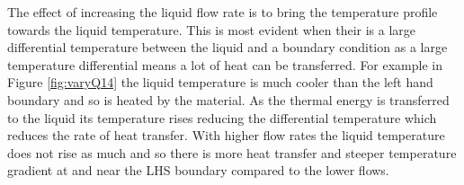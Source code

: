 \documentclass[11pt]{article}
\begin{document}
The effect of increasing the liquid flow rate is to bring the temperature profile towards the liquid temperature. This is most evident when their is a large differential temperature between the liquid and a boundary condition as a large temperature differential means a lot of heat can be transferred. For example in Figure \ref{fig:varyQ14} the liquid temperature is much cooler than the left hand boundary and so is heated by the material. As the thermal energy is transferred to the liquid its temperature rises reducing the differential temperature which reduces the rate of heat transfer. With higher flow rates the liquid temperature does not rise as much and so there is more heat transfer and steeper temperature gradient at and near the LHS boundary compared to the lower flows. 


\clearpage
\end{document}
